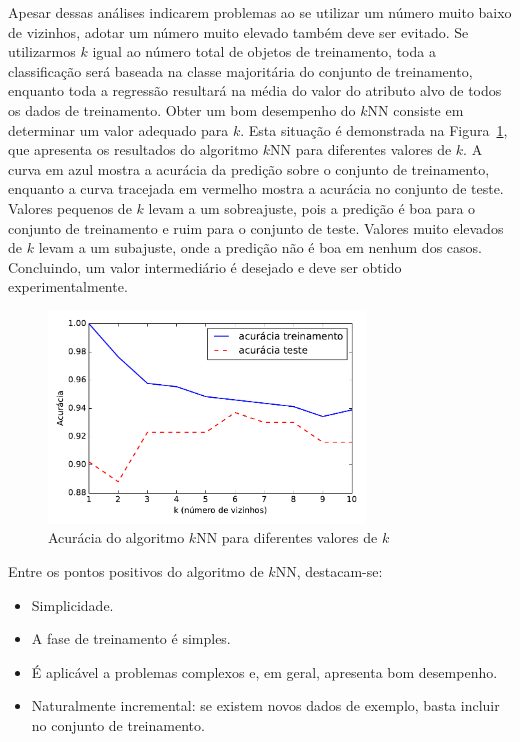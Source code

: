 Apesar dessas análises indicarem problemas ao se utilizar um número muito baixo de vizinhos, adotar um número muito elevado também deve ser evitado. Se utilizarmos $k$ igual ao número total de objetos de treinamento, toda a classificação será baseada na classe majoritária do conjunto de treinamento, enquanto toda a regressão resultará na média do valor do atributo alvo de todos os dados de treinamento. Obter um bom desempenho do $k$NN consiste em determinar um valor adequado para $k$. Esta situação é demonstrada na Figura~\ref{fig:acuracia-knn-diferentes-k}, que apresenta os resultados do algoritmo $k$NN para diferentes valores de $k$. A curva em azul mostra a acurácia da predição sobre o conjunto de treinamento, enquanto a curva tracejada em vermelho mostra a acurácia no conjunto de teste. Valores pequenos de $k$ levam a um sobreajuste, pois a predição é boa para o conjunto de treinamento e ruim para o conjunto de teste. Valores muito elevados de $k$ levam a um subajuste, onde a predição não é boa em nenhum dos casos. Concluindo, um valor intermediário é desejado e deve ser obtido experimentalmente.

\begin{figure}[h]
	\centering
	\includegraphics[width=0.75\textwidth]{img/acuracia-knn-diferentes-k}
	\caption{Acurácia do algoritmo $k$NN para diferentes valores de $k$}
	\label{fig:acuracia-knn-diferentes-k}
\end{figure}

Entre os pontos positivos do algoritmo de $k$NN, destacam-se:
\begin{itemize}
	\item Simplicidade.
	\item A fase de treinamento é simples.
	\item É aplicável a problemas complexos e, em geral, apresenta bom desempenho.
	\item Naturalmente incremental: se existem novos dados de exemplo, basta incluir no conjunto de treinamento.
\end{itemize}

